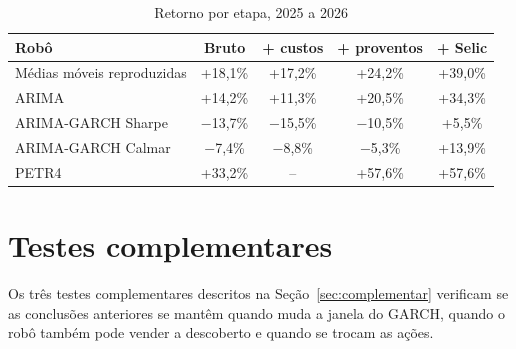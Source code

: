 \begin{table}[htbp]
\centering
\caption{Retorno por etapa, 2025 a 2026}
\label{tab:camadas-t3}
\fontsize{10}{12}\selectfont
\begin{tabular}{l|c|c|c|c}
\hline
Robô & Bruto & + custos & + proventos & + Selic \\
\hline
Médias móveis reproduzidas & +18,1\% & +17,2\% & +24,2\% & +39,0\% \\
\hline
ARIMA & +14,2\% & +11,3\% & +20,5\% & +34,3\% \\
\hline
ARIMA-GARCH Sharpe & $-$13,7\% & $-$15,5\% & $-$10,5\% & +5,5\% \\
\hline
ARIMA-GARCH Calmar & $-$7,4\% & $-$8,8\% & $-$5,3\% & +13,9\% \\
\hline
PETR4 & +33,2\% & -- & +57,6\% & +57,6\% \\
\hline
\end{tabular}
\end{table}

\FloatBarrier
\section{Testes complementares}
\label{sec:testes-complementares}

Os três testes complementares descritos na Seção~\ref{sec:complementar}
verificam se as conclusões anteriores se mantêm quando muda a janela do GARCH,
quando o robô também pode vender a descoberto e quando se trocam as ações.

